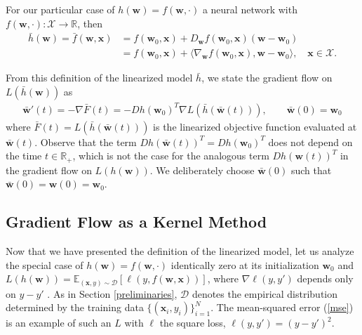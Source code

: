 \documentclass{article}
\begin{document}
For our particular case of $h(\boldsymbol{w}) = f(\boldsymbol{w}, \cdot)$ a neural network with $f(\boldsymbol{w}, \cdot): \mathcal{X} \rightarrow \mathbb{R}$, then
\begin{align}
    \bar{h}(\boldsymbol{w}) = \bar{f}(\boldsymbol{w}, \boldsymbol{x}) &= f(\boldsymbol{w}_0, \boldsymbol{x}) + D_{\boldsymbol{w}}f(\boldsymbol{w}_0, \boldsymbol{x})(\boldsymbol{w}-\boldsymbol{w}_0) \nonumber\\ 
    &= f(\boldsymbol{w}_0, \boldsymbol{x}) + \langle \nabla_{\boldsymbol{w}} f(\boldsymbol{w}_0, \boldsymbol{x}), \boldsymbol{w}-\boldsymbol{w}_0\rangle, \quad \boldsymbol{x} \in \mathcal{X}.\label{linearizedmodelnetwork}
\end{align}

From this definition of the linearized model $\bar{h}$, we state the gradient flow on $L(\bar{h}(\boldsymbol{w}))$ as 
\begin{align*}
    \boldsymbol{\bar{w}}'(t) = -\nabla \bar{F}(t) = - Dh(\boldsymbol{w}_0)^T \nabla L(\bar{h}(\boldsymbol{\bar{w}}(t))), \qquad \boldsymbol{\bar{w}}(0) = \boldsymbol{w}_0
\end{align*}
where $\bar{F}(t) = L(\bar{h}(\boldsymbol{\bar{w}}(t)))$ is the linearized objective function evaluated at $\boldsymbol{\bar{w}}(t)$. Observe that the term $Dh(\boldsymbol{\bar{w}}(t))^T = Dh(\boldsymbol{w}_0)^T$ does not depend on the time $t \in \mathbb{R}_+$, which is not the case for the analogous term $Dh(\boldsymbol{w}(t))^T$ in the gradient flow on $L(h(\boldsymbol{w}))$. We deliberately choose $\boldsymbol{\bar{w}}(0)$ such that $\boldsymbol{\bar{w}}(0) = \boldsymbol{w}(0) = \boldsymbol{w}_0$.

\subsection{Gradient Flow as a Kernel Method}\label{kernelmethod}

Now that we have presented the definition of the linearized model, let us analyze the special case of $h(\boldsymbol{w}) = f(\boldsymbol{w}, \cdot)$ identically zero at its initialization $\boldsymbol{w}_0$ and $L(h(\boldsymbol{w})) = \mathbb{E}_{(\boldsymbol{x}, y) \sim \mathcal{D}} [\ell(y, f(\boldsymbol{w}, \boldsymbol{x}))]$, where $\nabla \ell(y, y')$ depends only on $y - y'$ \cite{chizat2018note}. As in Section \ref{preliminaries}, $\mathcal{D}$ denotes the empirical distribution determined by the training data $\{ (\boldsymbol{x}_i, y_i) \}_{i=1}^N$. The mean-squared error (\ref{mse}) is an example of such an $L$ with $\ell$ the square loss, $\ell(y, y') = (y - y')^2$. 
\end{document}
